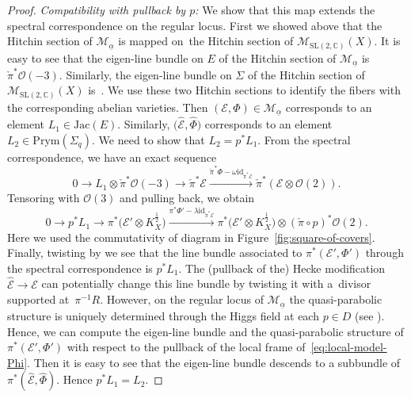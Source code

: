 \documentclass[pdftex]{sigma}
\numberwithin{equation}{section}
\theoremstyle{definition}
\newcommand{\Jac}{\mathrm{Jac}}
\renewcommand{\to}{\rightarrow}
\newcommand{\ualpha}{\underline{\alpha}}
\newcommand{\calE}{\mathcal{E}}
\newcommand{\calM}{\mathcal{M}}
\newcommand{\calO}{\mathcal{O}}
\newcommand{\CC}{\mathbb{C}}
\newcommand{\id}{\mathrm{id}}
\newcommand{\Prym}{\mathrm{Prym}}
\newcommand{\SL}{\mathrm{SL}}
\begin{document}
\begin{proof}
 \textit{Compatibility with pullback by $p$:} We show that this map extends the spectral correspondence on the regular locus. First we showed above that the Hitchin section of $\calM_{\underline{\alpha}}$ is mapped on~the Hitchin section of $\calM_{\SL(2,\CC)}(X)$. It is easy to see that the eigen-line bundle on $E$ of the Hitchin section of $\calM_{\underline{\alpha}}$ is $\check{\pi}^*\calO(-3)$. Similarly, the eigen-line bundle on $\Sigma$ of the Hitchin section of~$\calM_{\SL(2,\CC)}(X)$ is~. We use these two Hitchin sections to identify the fibers with the corresponding abelian varieties. Then $(\calE,\Phi) \in \calM_{\ualpha}$ corresponds to an element $L_1 \in \Jac(E)$. Similarly, $\bigl(\hat{\calE},\hat{\Phi}\bigr)$ corresponds to an element $L_2 \in \Prym(\Sigma_q)$. We need to show that $L_2=p^*L_1$. From the spectral correspondence, we have an exact sequence
 \[ 0 \to L_1 \otimes \check{\pi}^*\calO(-3) \to \check{\pi}^*\calE \xrightarrow{\check{\pi}^*\Phi-\omega \id_{\check{\pi}^* \calE}} \check{\pi}^* (\calE \otimes \calO(2) ).
 \]
 Tensoring with $\calO(3)$ and pulling back, we obtain
 \[ 0 \to p^*L_1 \to \pi^*\bigl(\calE' \otimes K_X^{\frac12}\bigr) \xrightarrow{\pi^*\Phi'-\lambda \id_{\check{\pi}^* \calE}} \pi^*\bigl(\calE' \otimes K_X^{\frac12}\bigr) \otimes (\check{\pi} \circ p)^*\calO(2).
 \]
 Here we used the commutativity of diagram in Figure~\ref{fig:square-of-covers}.
 Finally, twisting by  we see that the line bundle associated to $\pi^*(\calE',\Phi')$ through the spectral correspondence is $p^*L_1$. The (pullback of the) Hecke modification $\hat{\calE} \to \calE$ can potentially change this line bundle by twisting it with a~divisor supported at~$\pi^{-1}R$. However, on the regular locus of $\calM_{\underline{\alpha}}$ the quasi-parabolic structure is uniquely determined through the Higgs field at each $p \in D$ (see \cite[Proposition~8.1]{FMSW}). Hence, we can compute the eigen-line bundle and the quasi-parabolic structure of $\pi^*(\calE',\Phi')$ with respect to the pullback of the local frame of~\eqref{eq:local-model-Phi}. Then it is easy to see that the eigen-line bundle  descends to a subbundle of $\pi^*(\hat{\calE},\hat{\Phi})$. Hence $p^*L_1=L_2$.



\end{proof}
\end{document}
